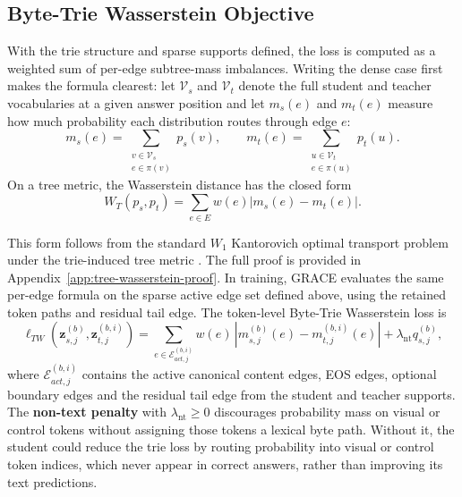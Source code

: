 \subsection{Byte-Trie Wasserstein Objective}

With the trie structure and sparse supports defined, the loss is computed as a
weighted sum of per-edge subtree-mass imbalances. Writing the dense case first
makes the formula clearest: let \(\mathcal{V}_s\) and \(\mathcal{V}_t\) denote
the full student and teacher vocabularies at a given answer position and let
\(m_s(e)\) and \(m_t(e)\) measure how much probability each distribution routes
through edge \(e\):
\[
m_s(e)
=
\sum_{\substack{v\in\mathcal{V}_s\\ e\in\pi(v)}} p_s(v),
\qquad
m_t(e)
=
\sum_{\substack{u\in\mathcal{V}_t\\ e\in\pi(u)}} p_t(u).
\]
On a tree metric, the Wasserstein distance has the closed form
\begin{equation}
W_T(p_s,p_t)
=
\sum_{e\in E}
w(e)\left|m_s(e)-m_t(e)\right|.
\label{eq:trie-wasserstein-objective}
\end{equation}

This form follows from the standard \(W_1\) Kantorovich optimal transport
problem under the trie-induced tree metric
\cite{peyre2019computationaloptimaltransport,takezawa2021supervisedtreewasserstein}.
The full proof is provided in Appendix~\ref{app:tree-wasserstein-proof}. In
training, GRACE evaluates the same per-edge formula on the sparse active edge
set defined above, using the retained token paths and residual tail edge.
The token-level Byte-Trie Wasserstein loss is
\begin{equation}
\ell_{TW}\!\left(\mathbf{z}_{s,j}^{(b)},\mathbf{z}_{t,j}^{(b,i)}\right)
=
\sum_{e\in\mathcal{E}_{act,j}^{(b,i)}}
w(e)\,
\left|
m_{s,j}^{(b)}(e)-m_{t,j}^{(b,i)}(e)
\right|
+
\lambda_{\mathrm{nt}}q_{s,j}^{(b)},
\label{eq:token_tw}
\end{equation}
where \(\mathcal{E}_{act,j}^{(b,i)}\) contains the active canonical content
edges, EOS edges, optional boundary edges and the residual tail edge from the
student and teacher supports. The \textbf{non-text penalty} with
\(\lambda_{\mathrm{nt}}\ge 0\) discourages probability mass on visual or
control tokens without assigning those tokens a lexical byte path.
Without it, the student could reduce the trie loss by routing probability
into visual or control token indices, which never appear in correct answers,
rather than improving its text predictions.

